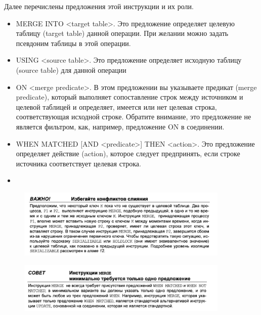 Далее перечислены предложения этой инструкции и их роли. 

\begin{itemize}
	\item MERGE INTO <target table>. Это предложение определяет целевую таблицу
	(target table) данной операции. При желании можно задать псевдоним таблицы
	в этой операции. 
	\item USING <source table>. Это предложение определяет исходную таблицу (source
	table) для данной операции
	\item ON <merge predicate>. В этом предложении вы указываете предикат (merge
	predicate), который выполняет сопоставление строк между источником и целевой таблицей и определяет, имеется или нет целевая строка, соответствующая
	исходной строке. Обратите внимание, это предложение не является фильтром,
	как, например, предложение ON в соединении. 
	\item WHEN MATCHED [AND <predicate>] THEN <action>. Это предложение определяет
	действие (action), которое следует предпринять, если строке источника соответствует целевая строка. 
	\item 
\end{itemize}

\begin{figure}[h!]
	\begin{center}
		\includegraphics[width=0.9\textwidth]{img/advice22.png}
	\end{center}
	\captionsetup{justification=centering}
\end{figure}

\begin{figure}[h!]
	\begin{center}
		\includegraphics[width=0.9\textwidth]{img/advice23.png}
	\end{center}
	\captionsetup{justification=centering}
\end{figure}


